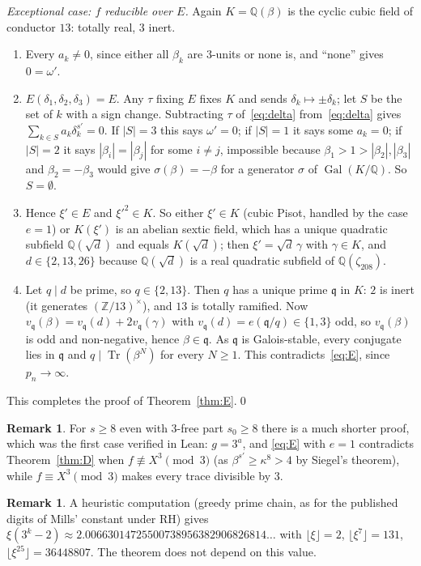 \documentclass[11pt]{amsart}
\theoremstyle{definition}
\newtheorem{remark}[theorem]{Remark}
\newcommand{\Z}{\mathbb{Z}}
\newcommand{\Q}{\mathbb{Q}}
\newcommand{\Tr}{\operatorname{Tr}}
\newcommand{\Gal}{\operatorname{Gal}}
\newcommand{\floor}[1]{\lfloor #1 \rfloor}
\begin{document}
\emph{Exceptional case: $f$ reducible over $E$.}  Again $K=\Q(\beta)$ is the cyclic cubic field of conductor $13$: totally real, $3$ inert.
\begin{enumerate}
\item Every $a_k\neq0$, since either all $\beta_k$ are $3$-units or none is, and ``none'' gives $0=\omega'$.
\item $E(\delta_1,\delta_2,\delta_3)=E$.  Any $\tau$ fixing $E$ fixes $K$ and sends $\delta_k\mapsto\pm\delta_k$; let $S$ be the set of $k$ with a sign change.  Subtracting $\tau$ of~\eqref{eq:delta} from~\eqref{eq:delta} gives $\sum_{k\in S}a_k\delta_k^{s'}=0$.  If $|S|=3$ this says $\omega'=0$; if $|S|=1$ it says some $a_k=0$; if $|S|=2$ it says $|\beta_i|=|\beta_j|$ for some $i\neq j$, impossible because $\beta_1>1>|\beta_2|,|\beta_3|$ and $\beta_2=-\beta_3$ would give $\sigma(\beta)=-\beta$ for a generator $\sigma$ of $\Gal(K/\Q)$.  So $S=\emptyset$.
\item Hence $\xi'\in E$ and $\xi'^2\in K$.  So either $\xi'\in K$ (cubic Pisot, handled by the case $e=1$) or $K(\xi')$ is an abelian sextic field, which has a unique quadratic subfield $\Q(\sqrt d)$ and equals $K(\sqrt d)$; then $\xi'=\sqrt d\,\gamma$ with $\gamma\in K$, and $d\in\{2,13,26\}$ because $\Q(\sqrt d)$ is a real quadratic subfield of $\Q(\zeta_{208})$.
\item Let $q\mid d$ be prime, so $q\in\{2,13\}$.  Then $q$ has a unique prime $\mathfrak q$ in $K$: $2$ is inert (it generates $(\Z/13)^\times$), and $13$ is totally ramified.  Now $v_{\mathfrak q}(\beta)=v_{\mathfrak q}(d)+2v_{\mathfrak q}(\gamma)$ with $v_{\mathfrak q}(d)=e(\mathfrak q/q)\in\{1,3\}$ odd, so $v_{\mathfrak q}(\beta)$ is odd and non-negative, hence $\beta\in\mathfrak q$.  As $\mathfrak q$ is Galois-stable, every conjugate lies in $\mathfrak q$ and $q\mid\Tr(\beta^N)$ for every $N\ge1$.  This contradicts~\eqref{eq:E}, since $p_n\to\infty$.
\end{enumerate}
This completes the proof of Theorem~\ref{thm:E}.\qed

\begin{remark}
For $s\ge8$ even with $3$-free part $s_0\ge8$ there is a much shorter proof, which was the first case verified in Lean: $g=3^a$, and \eqref{eq:E} with $e=1$ contradicts Theorem~\ref{thm:D} when $f\not\equiv X^3\pmod 3$ (as $\beta^{s'}\ge\kappa^{8}>4$ by Siegel's theorem), while $f\equiv X^3\pmod3$ makes every trace divisible by $3$.
\end{remark}

\begin{remark}
A heuristic computation (greedy prime chain, as for the published digits of Mills' constant under RH) gives $\xi(3^k-2)\approx2.00663014725500738956382906826814\ldots$ with $\floor{\xi}=2$, $\floor{\xi^7}=131$, $\floor{\xi^{25}}=36448807$.  The theorem does not depend on this value.
\end{remark}
\end{document}

